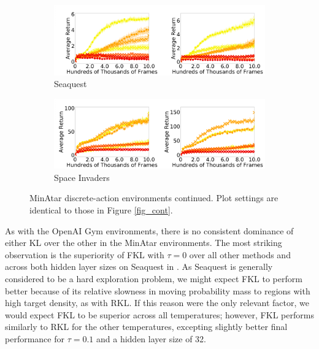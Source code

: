 \documentclass[\main/thesis.tex]{subfiles}
\begin{document}
\begin{figure}[!htb]
  \begin{subfigure}[b]{1\linewidth}
    \centering
    \includegraphics[width=\columnwidth]{figs/deep/discrete/seaquest_combined.png} 
    \caption{Seaquest
    }\label{fig:seaquest}
  \end{subfigure}%
  
  \begin{subfigure}[b]{1\linewidth}
    \centering
    \includegraphics[width=\columnwidth]{figs/deep/discrete/space_invaders_combined.png} 
    \caption{Space Invaders
    }\label{fig:space-invaders}
  \end{subfigure}
  \caption{MinAtar discrete-action environments continued. Plot settings are identical to those in Figure \ref{fig_cont}. }\label{fig:minatar2}
\end{figure}

As with the OpenAI Gym environments, there is no consistent dominance of either KL over the other in the MinAtar environments. The most striking observation is the superiority of FKL with $\tau = 0$ over all other methods and across both hidden layer sizes on Seaquest in . As Seaquest is generally considered to be a hard exploration problem, we might expect FKL to perform better because of its relative slowness in moving probability mass to regions with high target density, as with RKL. If this reason were the only relevant factor, we would expect FKL to be superior across all temperatures; however, FKL performs similarly to RKL for the other temperatures, excepting slightly better final performance for $\tau = 0.1$ and a hidden layer size of 32. 
\end{document}
